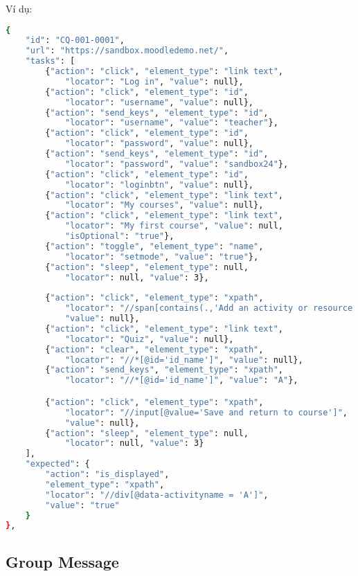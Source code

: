 Ví dụ:
\begin{lstlisting}[language=bash, caption={Ví dụ testcase CQ-001-0001 ở level 2}, breaklines=true]
{
    "id": "CQ-001-0001",
    "url": "https://sandbox.moodledemo.net/",
    "tasks": [
        {"action": "click", "element_type": "link text", 
            "locator": "Log in", "value": null},
        {"action": "click", "element_type": "id", 
            "locator": "username", "value": null},
        {"action": "send_keys", "element_type": "id", 
            "locator": "username", "value": "teacher"},
        {"action": "click", "element_type": "id", 
            "locator": "password", "value": null},
        {"action": "send_keys", "element_type": "id", 
            "locator": "password", "value": "sandbox24"},
        {"action": "click", "element_type": "id", 
            "locator": "loginbtn", "value": null},
        {"action": "click", "element_type": "link text", 
            "locator": "My courses", "value": null},
        {"action": "click", "element_type": "link text", 
            "locator": "My first course", "value": null, 
            "isOptional": "true"},
        {"action": "toggle", "element_type": "name", 
            "locator": "setmode", "value": "true"}, 
        {"action": "sleep", "element_type": null, 
            "locator": null, "value": 3},  
        
        {"action": "click", "element_type": "xpath", 
            "locator": "//span[contains(.,'Add an activity or resource')]", 
            "value": null},
        {"action": "click", "element_type": "link text", 
            "locator": "Quiz", "value": null},
        {"action": "clear", "element_type": "xpath", 
            "locator": "//*[@id='id_name']", "value": null},
        {"action": "send_keys", "element_type": "xpath", 
            "locator": "//*[@id='id_name']", "value": "A"},

        {"action": "click", "element_type": "xpath", 
            "locator": "//input[@value='Save and return to course']", 
            "value": null},
        {"action": "sleep", "element_type": null, 
            "locator": null, "value": 3}
    ],
    "expected": {
        "action": "is_displayed",
        "element_type": "xpath",
        "locator": "//div[@data-activityname = 'A']",
        "value": "true"
    }
},
\end{lstlisting}
\subsection{Group Message}
